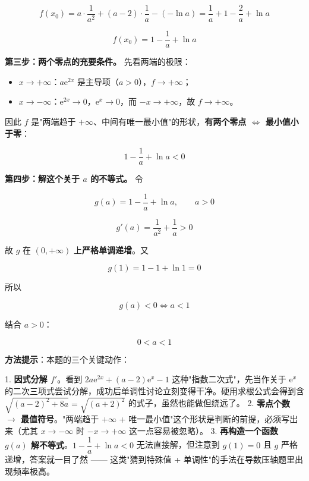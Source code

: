 \begin{answer}
\nopagebreak[4]
\[f\left(x_0\right)=a\cdot\frac1{a^{2}}+(a-2)\cdot\frac1a-\left(-\ln a\right)=\frac1a+1-\frac2a+\ln a\]

\nopagebreak[4]
\[f\left(x_0\right)=1-\frac1a+\ln a\]

\textbf{第三步：两个零点的充要条件。} 先看两端的极限：

\begin{itemize}
\item $x\to+\infty$：$a\mathrm e^{2x}$ 是主导项（$a>0$），$f\to+\infty$；
\item $x\to-\infty$：$\mathrm e^{2x}\to0$，$\mathrm e^{x}\to0$，而 $-x\to+\infty$，故 $f\to+\infty$。
\end{itemize}

因此 $f$ 是"两端趋于 $+\infty$、中间有唯一最小值"的形状，\textbf{有两个零点 $\iff$ 最小值小于零}：

\nopagebreak[4]
\[1-\frac1a+\ln a<0\]

\textbf{第四步：解这个关于 $a$ 的不等式。} 令

\nopagebreak[4]
\[g(a)=1-\frac1a+\ln a,\qquad a>0\]

\nopagebreak[4]
\[g'(a)=\frac1{a^{2}}+\frac1a>0\]

故 $g$ 在 $(0,+\infty)$ 上\textbf{严格单调递增}。又

\nopagebreak[4]
\[g(1)=1-1+\ln1=0\]

所以

\nopagebreak[4]
\[g(a)<0\iff a<1\]

结合 $a>0$：

\nopagebreak[4]
\[0<a<1\]

\begin{gktip}
\textbf{方法提示}：本题的三个关键动作：

1. \textbf{因式分解 $f'$}。看到 $2a\mathrm e^{2x}+(a-2)\mathrm e^{x}-1$ 这种"指数二次式"，先当作关于 $\mathrm e^{x}$ 的二次三项式尝试分解，成功后单调性讨论立刻变得干净。硬用求根公式会得到含 $\sqrt{(a-2)^{2}+8a}=\sqrt{(a+2)^{2}}$ 的式子，虽然也能做但绕远了。
2. \textbf{零点个数 $\to$ 最值符号}。"两端趋于 $+\infty$ + 唯一最小值"这个形状是判断的前提，必须写出来（尤其 $x\to-\infty$ 时 $-x\to+\infty$ 这一点容易被忽略）。
3. \textbf{再构造一个函数 $g(a)$ 解不等式}。$1-\dfrac1a+\ln a<0$ 无法直接解，但注意到 $g(1)=0$ 且 $g$ 严格递增，答案就一目了然 —— 这类"猜到特殊值 + 单调性"的手法在导数压轴题里出现频率极高。
\end{gktip}



\par\medskip

\end{answer}

